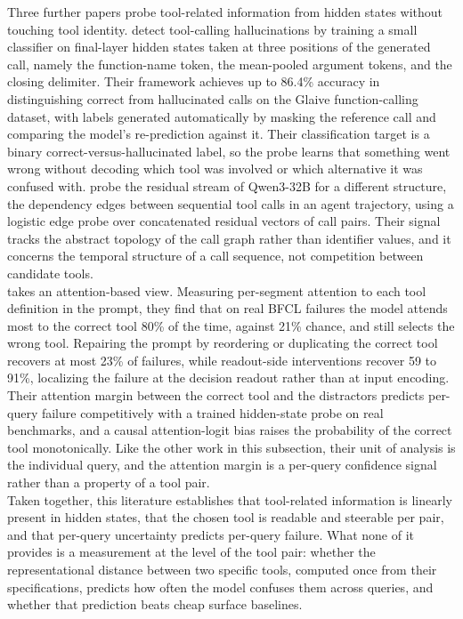 Three further papers probe tool-related information from hidden states without touching tool identity.
\textcite{healy2026internal} detect tool-calling hallucinations by training a small classifier on final-layer hidden states taken at three positions of the generated call, namely the function-name token, the mean-pooled argument tokens, and the closing delimiter.
Their framework achieves up to 86.4\% accuracy in distinguishing correct from hallucinated calls on the Glaive function-calling dataset, with labels generated automatically by masking the reference call and comparing the model's re-prediction against it.
Their classification target is a binary correct-versus-hallucinated label, so the probe learns that something went wrong without decoding which tool was involved or which alternative it was confused with.
\textcite{sun2026dependency} probe the residual stream of Qwen3-32B for a different structure, the dependency edges between sequential tool calls in an agent trajectory, using a logistic edge probe over concatenated residual vectors of call pairs.
Their signal tracks the abstract topology of the call graph rather than identifier values, and it concerns the temporal structure of a call sequence, not competition between candidate tools.
\\

\textcite{chen2026looking} takes an attention-based view.
Measuring per-segment attention to each tool definition in the prompt, they find that on real BFCL failures the model attends most to the correct tool 80\% of the time, against 21\% chance, and still selects the wrong tool.
Repairing the prompt by reordering or duplicating the correct tool recovers at most 23\% of failures, while readout-side interventions recover 59 to 91\%, localizing the failure at the decision readout rather than at input encoding.
Their attention margin between the correct tool and the distractors predicts per-query failure competitively with a trained hidden-state probe on real benchmarks, and a causal attention-logit bias raises the probability of the correct tool monotonically.
Like the other work in this subsection, their unit of analysis is the individual query, and the attention margin is a per-query confidence signal rather than a property of a tool pair.
\\

Taken together, this literature establishes that tool-related information is linearly present in hidden states, that the chosen tool is readable and steerable per pair, and that per-query uncertainty predicts per-query failure.
What none of it provides is a measurement at the level of the tool pair: whether the representational distance between two specific tools, computed once from their specifications, predicts how often the model confuses them across queries, and whether that prediction beats cheap surface baselines.

